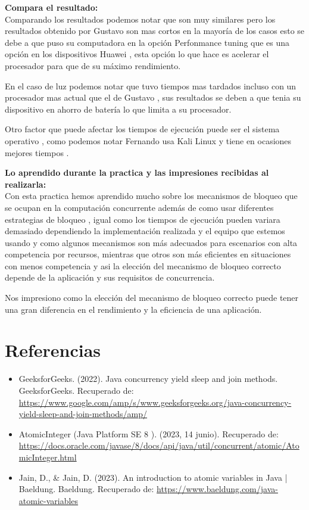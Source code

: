 \documentclass[12pt]{article}
\begin{document}
  \textbf{Compara el resultado:}\\

  
Comparando los resultados podemos notar que son muy similares pero los resultados obtenido por Gustavo son mas cortos en la mayoría de los casos esto se debe a que puso su computadora en la opción Perfonmance tuning que es una opción en los dispositivos Huawei , esta opción lo que hace es acelerar el procesador para que de su máximo rendimiento.


En el caso de luz podemos notar que tuvo tiempos mas tardados incluso con un procesador mas actual que el de Gustavo , sus resultados se deben a que tenia su dispositivo en ahorro de batería lo que limita a su procesador.

Otro factor que puede afectar los tiempos de ejecución puede ser el sistema operativo , como podemos notar Fernando usa Kali Linux y tiene en ocasiones mejores tiempos .


\textbf{Lo aprendido durante la practica y las impresiones recibidas al realizarla:}\\


Con esta practica hemos aprendido mucho sobre los mecanismos de bloqueo que se ocupan en la computación concurrente además de como usar diferentes estrategias de bloqueo , igual como los tiempos de ejecución pueden variara demasiado dependiendo la implementación realizada y el equipo que estemos usando  y como algunos mecanismos son más adecuados para escenarios con alta competencia por recursos, mientras que otros son más eficientes en situaciones con menos competencia y asi la elección del mecanismo de bloqueo correcto depende de la aplicación y sus requisitos de concurrencia. 

Nos impresiono como la elección del mecanismo de bloqueo correcto puede tener una gran diferencia en el rendimiento y la eficiencia de una aplicación.


\newpage

\section*{Referencias}
\begin{itemize}
    \item GeeksforGeeks. (2022). Java concurrency yield sleep and join methods. GeeksforGeeks. Recuperado de: \url{https://www.google.com/amp/s/www.geeksforgeeks.org/java-concurrency-yield-sleep-and-join-methods/amp/}

     \item  AtomicInteger (Java Platform SE 8 ). (2023, 14 junio).  Recuperado de: \url{https://docs.oracle.com/javase/8/docs/api/java/util/concurrent/atomic/AtomicInteger.html}
    

      \item  Jain, D., \& Jain, D. (2023). An introduction to atomic variables in Java | Baeldung. Baeldung.  Recuperado de: \url{https://www.baeldung.com/java-atomic-variables}


     
\end{itemize}
\end{document}
